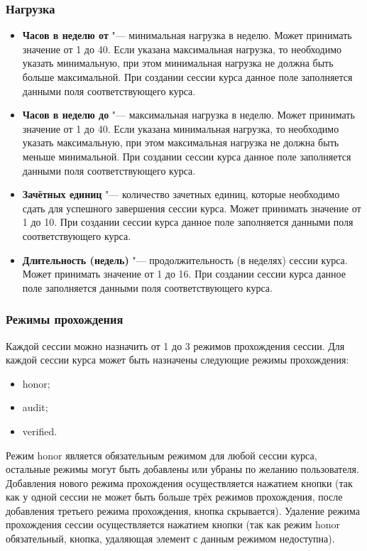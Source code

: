 \subsubsection{Нагрузка}
	\begin{itemize}
		\item \textbf{Часов в неделю от} "--- минимальная нагрузка в неделю. Может принимать значение от 1 до 40. Если указана максимальная нагрузка, то необходимо указать минимальную, при этом минимальная нагрузка не должна быть больше максимальной. При создании сессии курса данное поле заполняется данными поля  соответствующего курса.
		
		\item \textbf{Часов в неделю до} "--- максимальная нагрузка в неделю. Может принимать значение от 1 до 40. Если указана минимальная нагрузка, то необходимо указать максимальную, при этом максимальная нагрузка не должна быть меньше минимальной. При создании сессии курса данное поле заполняется данными поля  соответствующего курса.
		
		\item \textbf{Зачётных единиц} "--- количество зачетных единиц, которые необходимо сдать для успешного завершения сессии курса. Может принимать значение от 1 до 10. При создании сессии курса данное поле заполняется данными поля  соответствующего курса.
		
		\item \textbf{Длительность (недель)} "--- продолжительность (в неделях) сессии курса. Может принимать значение от 1 до 16. При создании сессии курса данное поле заполняется данными поля  соответствующего курса.
	\end{itemize}
	
\subsubsection{Режимы прохождения}
	Каждой сессии можно назначить от 1 до 3 режимов прохождения сессии. Для каждой сессии курса может быть назначены следующие режимы прохождения:
	\begin{itemize}
		\item honor;
		\item audit;
		\item verified.
	\end{itemize}
	Режим honor является обязательным режимом для любой сессии курса, остальные режимы могут быть добавлены или убраны по желанию пользователя. Добавления нового режима прохождения осуществляется нажатием кнопки  (так как у одной сессии не может быть больше трёх режимов прохождения, после добавления третьего режима прохождения, кнопка  скрывается). Удаление режима прохождения сессии осуществляется нажатием кнопки  (так как режим honor обязательный, кнопка, удаляющая элемент с данным режимом недоступна).
	
